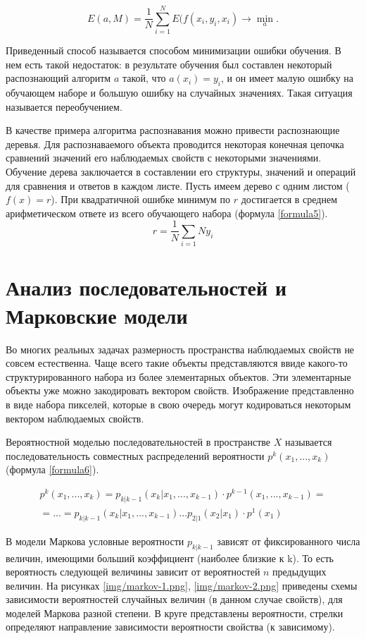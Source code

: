 \begin{equation}
E(a, M) = \frac{1}{N} \sum_{i=1}^{N}E(f(x_i, y_i, x_i) \to \min_a.
\label{formula4}
\end{equation}

Приведенный способ называется способом минимизации ошибки обучения. В нем есть такой недостаток: в результате обучения был составлен некоторый распознающий алгоритм $a$ такой, что $a(x_i) = y_i$, и он имеет малую ошибку на обучающем наборе и большую ошибку на случайных значениях. Такая ситуация называется переобучением.

В качестве примера алгоритма распознавания можно привести распознающие деревья. Для распознаваемого объекта проводится некоторая конечная цепочка сравнений значений его наблюдаемых свойств с некоторыми значениями. Обучение дерева заключается в составлении его структуры, значений и операций для сравнения и ответов в каждом листе. Пусть имеем дерево с одним листом ($f(x) = r$). При квадратичной ошибке минимум по $r$ достигается в среднем арифметическом ответе из всего обучающего набора (формула \ref{formula5}).
\begin{equation}
r = \frac{1}{N}\sum_{i=1}{N}y_i
\label{formula5}
\end{equation}

\chapter{Анализ последовательностей и Марковские модели}
Во многих реальных задачах размерность пространства наблюдаемых свойств не совсем естественна. Чаще всего такие объекты представляются ввиде какого-то структурированного набора из более элементарных объектов. Эти элементарные объекты уже можно закодировать вектором свойств. Изображение представленно в виде набора пикселей, которые в свою очередь могут кодироваться некоторым вектором наблюдаемых свойств.

Вероятностной моделью последовательностей в пространстве $X$ называется последовательность совместных распределений вероятности $p^k(x_1, ..., x_k)$ (формула \ref{formula6}).

\begin{multline}
p^k(x_1, ..., x_k) = p_{k|k-1}(x_k|x_1, ... , x_{k-1}) \cdot p^{k-1}(x_1, ... , x_{k-1}) = \\
= ... = p_{k|k-1}(x_k|x_1, ... , x_{k -1}) ... p_{2|1}(x_2|x_1) \cdot p^1(x_1)
\label{formula6}
\end{multline}

В модели Маркова условные вероятности $p_{k|k-1}$ зависят от фиксированного числа величин, имеющими больший коэффициент (наиболее близкие к k). То есть вероятность следующей величины зависит от вероятностей $n$ предыдущих величин. На рисунках \ref{img/markov-1.png}, \ref{img/markov-2.png} приведены схемы зависимости вероятностей случайных величин (в данном случае свойств), для моделей Маркова разной степени. В круге представлены вероятности, стрелки определяют направление зависимости вероятности свойства (к зависимому). 

